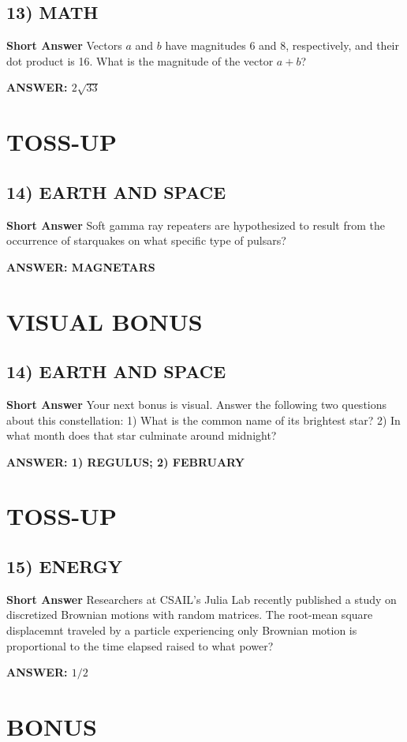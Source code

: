 \documentclass{article}
\begin{document}
\subsection*{13) MATH}
\textbf{Short Answer} Vectors $a$ and $b$ have magnitudes 6 and 8, respectively, and their dot product is 16. What is the magnitude of the vector $a+b$?

\textbf{ANSWER: $2\sqrt{33}$}

\section*{TOSS-UP}
\subsection*{14) EARTH AND SPACE}
\textbf{Short Answer} Soft gamma ray repeaters are hypothesized to result from the occurrence of starquakes on what specific type of pulsars?

\textbf{ANSWER: MAGNETARS}

\section*{VISUAL BONUS}
\subsection*{14) EARTH AND SPACE}
\textbf{Short Answer} Your next bonus is visual.
Answer the following two questions about this constellation: 1) What is the common name of its brightest star?
2) In what month does that star culminate around midnight?

\textbf{ANSWER: 1) REGULUS; 2) FEBRUARY}

\section*{TOSS-UP}
\subsection*{15) ENERGY}
\textbf{Short Answer} Researchers at CSAIL's Julia Lab recently published a study on discretized Brownian motions with random matrices.
The root-mean square displacemnt traveled by a particle experiencing only Brownian motion is proportional to the time elapsed raised to what power?

\textbf{ANSWER: $1/2$}

\section*{BONUS}
\end{document}

